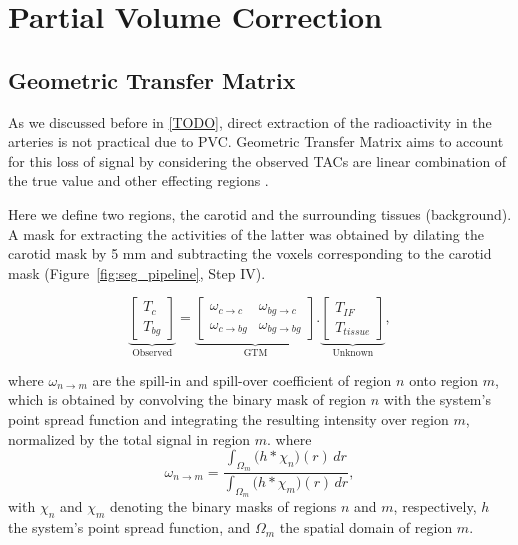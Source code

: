 \section{Partial Volume Correction}
\subsection{Geometric Transfer Matrix}
As we discussed before in \ref{TODO}, direct extraction of the radioactivity in the arteries is not practical due to PVC.
Geometric Transfer Matrix aims to account for this loss of signal by considering the observed TACs are linear combination of the true value and other effecting regions \cite{rousset1998correction}.

Here we define two regions, the carotid and the surrounding tissues (background).
A mask for extracting the activities of the latter was obtained by dilating the carotid mask by 5 mm and subtracting the voxels corresponding to the carotid mask (Figure~\ref{fig:seg_pipeline}, Step IV).

\begin{equation}
	\underbrace{
		\begin{bmatrix}
			T_{c} \\
			T_{bg}
		\end{bmatrix}
	}_{\text{Observed}}
	=
	\underbrace{
		\begin{bmatrix}
			\omega_{c \rightarrow c}  & \omega_{bg \rightarrow c}  \\
			\omega_{c \rightarrow bg} & \omega_{bg \rightarrow bg}
		\end{bmatrix}
	}_{\text{GTM}}
	.
	\underbrace{
		\begin{bmatrix}
			T_{IF} \\
			T_{tissue}
		\end{bmatrix}
	}_{\text{Unknown}},
\end{equation}

where $\omega_{n \rightarrow m}$ are the spill-in and spill-over coefficient of region $n$ onto region $m$, which is obtained by convolving the binary mask of region $n$ with the system's point spread function and integrating the resulting intensity over region $m$, normalized by the total signal in region $m$.
where
\begin{equation}
	\omega_{n\to m} = \frac{\displaystyle \int_{\Omega_m} \bigl( h \ast \chi_n \bigr)(r)\,dr}{\displaystyle \int_{\Omega_m} \bigl( h \ast \chi_m \bigr)(r)\,dr},
\end{equation}
with \(\chi_n\) and \(\chi_m\) denoting the binary masks of regions \(n\) and \(m\), respectively, \(h\) the system's point spread function, and \(\Omega_m\) the spatial domain of region \(m\).

